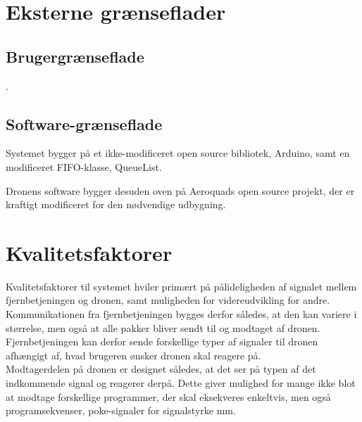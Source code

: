\documentclass[Main]{subfiles}
\begin{document}
\chapter{Eksterne grænseflader}

\section{Brugergrænseflade}
.



\section{Software-grænseflade}
Systemet bygger på et ikke-modificeret open source bibliotek, Arduino\cite{Arduino}, samt en modificeret FIFO-klasse\cite{FIFO}, QueueList\cite{QueueList}.


Dronens software bygger desuden oven på Aeroquads open source projekt\cite{AQ-software}, der er kraftigt modificeret for den nødvendige udbygning.






%






\chapter{Kvalitetsfaktorer}
Kvalitetsfaktorer til systemet hviler primært på pålideligheden af signalet mellem fjernbetjeningen og dronen, samt muligheden for videreudvikling for andre.
\\
Kommunikationen fra fjernbetjeningen bygges derfor således, at den kan variere i størrelse, men også at alle pakker bliver sendt til og modtaget af dronen.
Fjernbetjeningen kan derfor sende forskellige typer af signaler til dronen afhængigt af, hvad brugeren ønsker dronen skal reagere på.
\\
Modtagerdelen på dronen er designet således, at det ser på typen af det indkommende signal og reagerer derpå.
Dette giver mulighed for mange ikke blot at modtage forskellige programmer, der skal eksekveres enkeltvis, men også programsekvenser, poke-signaler for signalstyrke mm.
\end{document}
